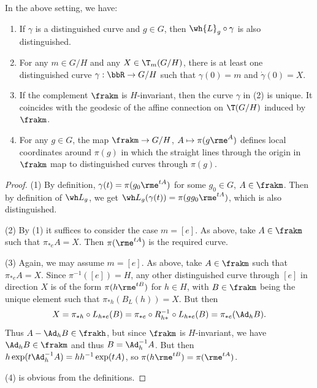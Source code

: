 \begin{prop}\label{prop 1.4.11 Cap}
    In the above setting, we have: 
    \begin{enumerate}[label=(\arabic*)]
        \item If $\gamma$ is a distinguished curve and $g\in G$, then $\wh{L}_g\circ\gamma$ is also distinguished.
        \item For any $m\in G\slash H$ and any $X\in \T_m(G\slash H)$, there is at least one distinguished curve $\gamma:\bbR\to G\slash H$ such that $\gamma(0)=m$ and $\dot\gamma(0)=X$.
        \item If the complement $\frakm$ is $H$-invariant, then the curve $\gamma$ in (2) is unique. It coincides with the geodesic of the affine connection on $\T(G\slash H)$ induced by $\frakm$.
        \item For any $g\in G$, the map $\frakm\to G\slash H$, $A\mapsto \pi(g\rme^A)$ defines local coordinates around $\pi(g)$ in which the straight lines through the origin in $\frakm$ map to distinguished curves through $\pi(g)$.
    \end{enumerate}
\end{prop}
\begin{proof}
    (1) By definition, $\gamma(t)=\pi(g_0\rme^{tA})$ for some $g_0\in G$, $A\in\frakm$. Then by definition of $\wh L_g$, we get $\wh L_g(\gamma(t))=\pi(gg_0\rme^{tA})$, which is also distinguished.

    (2) By (1) it suffices to consider the case $m=[e]$. As above, take $A\in\frakm$ such that $\pi_{\ast e}A=X$. Then $\pi(\rme^{tA})$ is the required curve.

    (3) Again, we may assume $m=[e]$. As above, take $A\in\frakm$ such that $\pi_{\ast e}A=X$. Since $\pi^{-1}([e])=H$, any other distinguished curve through $[e]$ in direction $X$ is of the form $\pi(h\rme^{tB})$ for $h\in H$, with $B\in\frakm$ being the unique element such that $\pi_{\ast h}(B_L(h))=X$. But then 
    \[X=\pi_{\ast h}\circ L_{h\ast e}(B)=\pi_{\ast e}\circ R_{h\ast}^{-1}\circ L_{h\ast e}(B)=\pi_{\ast e}(\Ad_h B).\]
    Thus $A-\Ad_h B\in\frakh$, but since $\frakm$ is $H$-invariant, we have $\Ad_h B\in\frakm$ and thus $B=\Ad_h^{-1}A$. But then $h\exp(t\Ad_{h}^{-1}A)=hh^{-1}\exp(tA)$, so $\pi(h\rme^{tB})=\pi(\rme^{tA})$.

    (4) is obvious from the definitions.
\end{proof}

